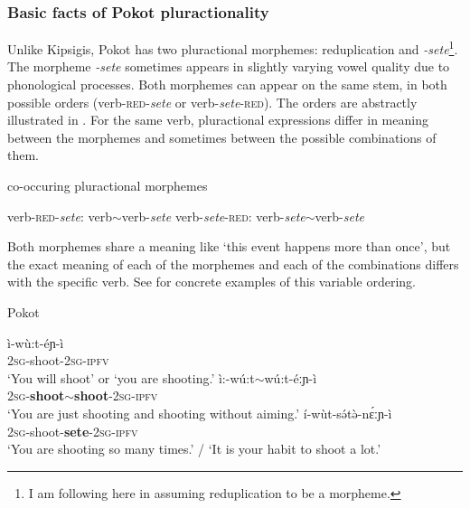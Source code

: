 \documentclass[output=paper,colorlinks,citecolor=brown
]{langscibook}
\begin{document}
\subsubsection{Basic facts of Pokot pluractionality}
Unlike Kipsigis, Pokot has two pluractional morphemes: reduplication and \textit{-sete}\footnote{I am following \cite{Marantz82} here in assuming reduplication to be a morpheme.}. The morpheme \textit{-sete} sometimes appears in slightly varying vowel quality due to phonological processes. 
Both morphemes can appear on the same stem, in both possible orders (verb-\textsc{red}-\textit{sete} or verb-\textit{sete}-\textsc{red}). The orders are abstractly illustrated in . For the same verb, pluractional expressions differ in meaning between the morphemes and sometimes between the possible combinations of them. 

\ea co-occuring pluractional morphemes \label{ex:fiebig:abstr}
\begin{xlist}
\ex verb-\textsc{red}-\textit{sete}: verb$\sim$verb-\textit{sete} \label{ex:fiebig:abstra}
\ex verb-\textit{sete}-\textsc{red}: verb-\textit{sete}$\sim$verb-\textit{sete} 
\end{xlist}
\z

Both morphemes share a meaning like `this event happens more than once', but the exact meaning of each of the morphemes and each of the combinations differs with the specific verb. See  for concrete examples of this variable ordering.


\ea Pokot \label{ex:fiebig:telicity}
\begin{xlist}
\ex 
\gll ì-wù:t-éɲ-ì\\
\textsc{2sg}-shoot-\textsc{2sg-ipfv}\\
\glt `You will shoot' or `you are shooting.'
\ex 
\gll ì:-wú:t$\sim$wú:t-éːɲ-ì\\
\textsc{2sg}-\textbf{shoot$\sim$shoot}-\textsc{2sg-ipfv}\\
\glt `You are just shooting and shooting without aiming.' \label{ex:fiebig:-red}
\ex 
\gll í-wùt-sə́tə̀-nɛ́ːɲ-ì\\
2\textsc{sg}-shoot-\textbf{sete}-2\textsc{sg-ipfv}\\
\glt `You are shooting so many times.' / `It is your habit to shoot a lot.' \label{ex:fiebig:-sete}
\end{xlist}
\z
\end{document}
